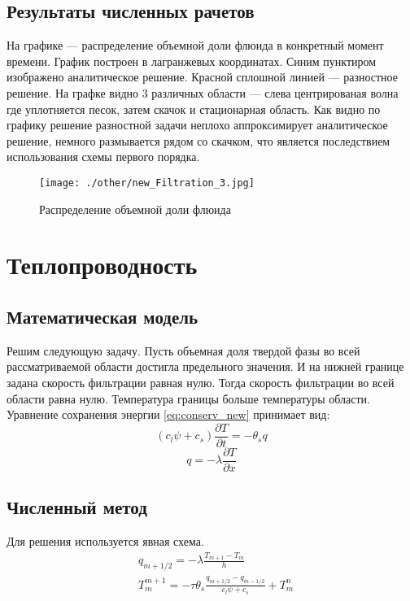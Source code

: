 \documentclass[12pt,a4paper]{article}
\newcommand{\pd}[2]{\frac{\partial #1}{\partial #2}}
\begin{document}
\subsection{Результаты численных рачетов}
На графике --- распределение объемной доли флюида в конкретный момент времени. График построен в лагранжевых координатах. Синим пунктиром изображено аналитическое решение. Красной сплошной линией --- разностное решение. На графке видно 3 различных области --- слева центрированая волна где уплотняется песок, затем скачок и стационарная область. Как видно по графику решение разностной задачи неплохо аппроксимирует аналитическое решение, немного размывается рядом со скачком, что является последствием использования схемы первого порядка.
\begin{figure}[h!]
\begin{center}
\texttt{[image: ./other/new\_Filtration\_3.jpg]}
\caption{Распределение объемной доли флюида}
\end{center}
\end{figure}

\newpage
\section{Теплопроводность}
\subsection{Математическая модель}
Решим следующую задачу. 
Пусть объемная доля твердой фазы во всей рассматриваемой области достигла предельного значения. И на нижней границе задана скорость фильтрации равная нулю. Тогда скорость фильтрации во всей области равна нулю. Температура границы больше температуры области. Уравнение сохранения энергии \eqref{eq:conserv_new} принимает вид:
$$
(c_l \psi + c_s)\pd{T}{t} =-\theta_s q
$$
$$
q = -\lambda\pd{T}{x}
$$

\subsection{Численный метод}
Для решения используется явная схема.
\begin{equation}
\begin{aligned}
&q_{m+1/2} = - \lambda\frac{T_{m+1} - T_m}{h}\\
&T_m^{m+1} = - \tau \theta_s\frac{q_{m+1/2} - q_{m-1/2}}{c_l \psi + c_s} + T_m^n\\
\label{termal_razn}
\end{aligned}
\end{equation}
\end{document}
